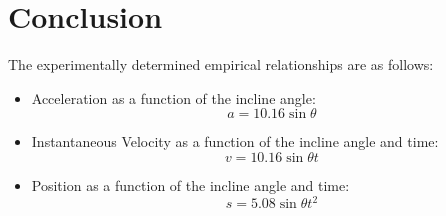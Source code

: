 
\section*{Conclusion}

The experimentally determined empirical relationships are as follows:

\begin{itemize}
  \item{
    Acceleration as a function of the incline angle:
    \begin{equation}
      a = 10.16\sin{\theta}
    \end{equation}
  }
  \item{
    Instantaneous Velocity as a function of the incline angle and time:
    \begin{equation}
      v = 10.16\sin{\theta}t
    \end{equation}
  }
  \item{
    Position as a function of the incline angle and time:
    \begin{equation}
      s = 5.08\sin{\theta}t^2
    \end{equation}
  }
\end{itemize}
